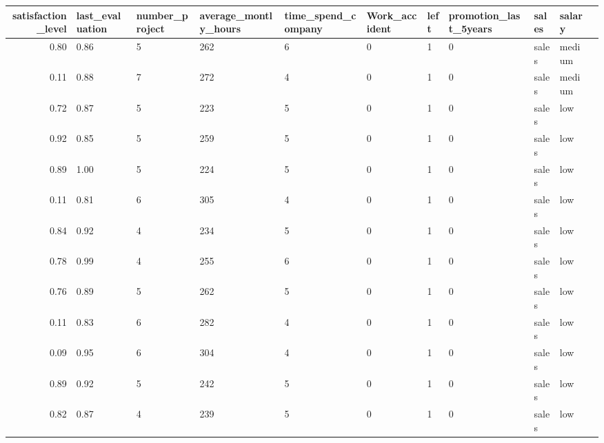 \documentclass[11pt]{article}
\begin{document}
    
    \begin{tabular}{r|llllllllll}
 satisfaction\_level & last\_evaluation & number\_project & average\_montly\_hours & time\_spend\_company & Work\_accident & left & promotion\_last\_5years & sales & salary\\
\hline
	 0.80        & 0.86        & 5           & 262         & 6           & 0           & 1           & 0           & sales       & medium     \\
	 0.11        & 0.88        & 7           & 272         & 4           & 0           & 1           & 0           & sales       & medium     \\
	 0.72        & 0.87        & 5           & 223         & 5           & 0           & 1           & 0           & sales       & low        \\
	 0.92        & 0.85        & 5           & 259         & 5           & 0           & 1           & 0           & sales       & low        \\
	 0.89        & 1.00        & 5           & 224         & 5           & 0           & 1           & 0           & sales       & low        \\
	 0.11        & 0.81        & 6           & 305         & 4           & 0           & 1           & 0           & sales       & low        \\
	 0.84        & 0.92        & 4           & 234         & 5           & 0           & 1           & 0           & sales       & low        \\
	 0.78        & 0.99        & 4           & 255         & 6           & 0           & 1           & 0           & sales       & low        \\
	 0.76        & 0.89        & 5           & 262         & 5           & 0           & 1           & 0           & sales       & low        \\
	 0.11        & 0.83        & 6           & 282         & 4           & 0           & 1           & 0           & sales       & low        \\
	 0.09        & 0.95        & 6           & 304         & 4           & 0           & 1           & 0           & sales       & low        \\
	 0.89        & 0.92        & 5           & 242         & 5           & 0           & 1           & 0           & sales       & low        \\
	 0.82        & 0.87        & 4           & 239         & 5           & 0           & 1           & 0           & sales       & low        \\

\end{tabular}
\end{document}
